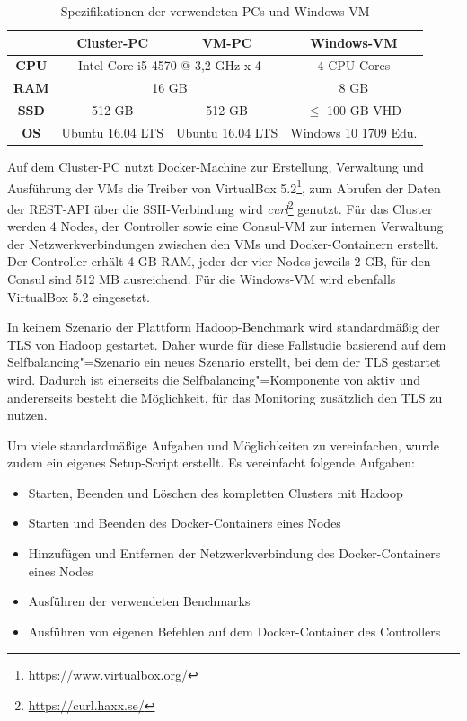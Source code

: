 \begin{table}
    \centering
    \begin{tabular}{|c|c|c|c|}
    	\hline
    	 \textbf{}   & \textbf{Cluster-PC} &         \textbf{VM-PC}          & \textbf{Windows-VM}  \\ \hline\hline
    	\textbf{CPU} & \multicolumn{2}{c|}{Intel Core i5-4570 @ 3,2 GHz x 4} &     4 CPU Cores      \\ \hline
    	\textbf{RAM} &              \multicolumn{2}{c|}{16 GB}               &         8 GB         \\ \hline
    	\textbf{SSD} &       512 GB        &             512 GB              &  $\leq$ 100 GB VHD   \\ \hline
    	\textbf{OS}  &  Ubuntu 16.04 LTS   &        Ubuntu 16.04 LTS         & Windows 10 1709 Edu. \\ \hline
    \end{tabular}
    \caption{Spezifikationen der verwendeten PCs und Windows-VM}
    \label{tab:pcSpecs}
\end{table}

Auf dem Cluster-PC nutzt Docker-Machine zur Erstellung, Verwaltung und Ausführung der VMs die Treiber von VirtualBox 5.2\footnote{\url{https://www.virtualbox.org/}}, zum Abrufen der Daten der REST-API über die SSH-Verbindung wird \emph{curl}\footnote{\url{https://curl.haxx.se/}} genutzt. Für das Cluster werden 4 Nodes, der Controller sowie eine Consul-VM zur internen Verwaltung der Netzwerkverbindungen zwischen den VMs und Docker-Containern erstellt. Der Controller erhält 4 GB RAM, jeder der vier Nodes jeweils 2 GB, für den Consul sind 512 MB ausreichend. Für die Windows-VM wird ebenfalls VirtualBox 5.2 eingesetzt.

In keinem Szenario der Plattform Hadoop-Benchmark wird standardmäßig der \ac{TLS} von Hadoop gestartet. Daher wurde für diese Fallstudie basierend auf dem Selfbalancing"=Szenario ein neues Szenario erstellt, bei dem der \ac{TLS} gestartet wird. Dadurch ist einerseits die Selfbalancing"=Komponente von \citeauthor{zhang2016} aktiv und andererseits besteht die Möglichkeit, für das Monitoring zusätzlich den \ac{TLS} zu nutzen.

Um viele standardmäßige Aufgaben und Möglichkeiten zu vereinfachen, wurde zudem ein eigenes Setup-Script erstellt. Es vereinfacht folgende Aufgaben:

\begin{itemize}
    \item Starten, Beenden und Löschen des kompletten Clusters mit Hadoop
    \item Starten und Beenden des Docker-Containers eines Nodes
    \item Hinzufügen und Entfernen der Netzwerkverbindung des Docker-Containers eines Nodes
    \item Ausführen der verwendeten Benchmarks
    \item Ausführen von eigenen Befehlen auf dem Docker-Container des Controllers
\end{itemize}

